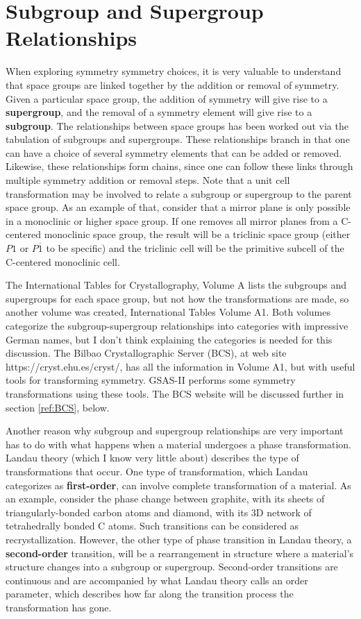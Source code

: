 \section{Subgroup and Supergroup Relationships}

When exploring symmetry symmetry choices, it is very valuable to understand that space groups are linked together by the addition or removal of symmetry. Given a particular space group, the addition of symmetry will give rise to a \textbf{supergroup}, and the removal of a symmetry element will give rise to a \textbf{subgroup}. The relationships between space groups has been worked out via the tabulation of subgroups and supergroups. These relationships branch in that one can have a choice of several symmetry elements that can be added or removed. Likewise, these relationships form chains, since one can follow these links through multiple symmetry addition or removal steps. Note that a unit cell transformation may be involved to relate a subgroup or supergroup to the parent space group. As an example of that, consider that a mirror plane is only possible in a monoclinic or higher space group. If one removes all mirror planes from a C-centered monoclinic space group, the result will be a triclinic space group (either $P 1$ or $P \overline{1}$ to be specific) and the triclinic cell will be the primitive subcell of the C-centered monoclinic cell. 

The International Tables for Crystallography, Volume A lists the subgroups and supergroups for each space group, but not how the transformations are made, so another volume was created, International Tables Volume A1. Both volumes categorize the subgroup-supergroup relationships into categories with impressive German names, but I don't think explaining the categories is needed for this discussion. The Bilbao Crystallographic Server (BCS), at web site https://cryst.ehu.es/cryst/, has all the information in Volume A1, but with useful tools for transforming symmetry. GSAS-II performs some symmetry transformations using these tools. The BCS website will be discussed further in section \ref{ref:BCS}, below. 

Another reason why subgroup and supergroup relationships are very important has to do with what happens when a material undergoes a phase transformation. Landau theory (which I know very little about) describes the type of transformations that occur. One type of transformation, which Landau categorizes as \textbf{first-order}, can involve complete transformation of a material. As an example, consider the phase change between graphite, with its sheets of triangularly-bonded carbon atoms and diamond, with its 3D network of tetrahedrally bonded C atoms. Such transitions can be considered as recrystallization. However, the other type of phase transition in Landau theory, a \textbf{second-order} transition, will be a rearrangement in structure where a material's structure changes into a subgroup or supergroup. Second-order transitions are continuous and are accompanied by what Landau theory calls an order parameter, which describes how far along the transition process the transformation has gone. 

